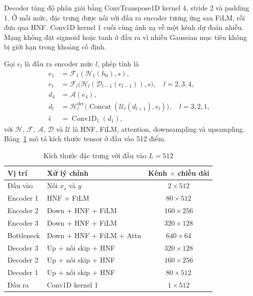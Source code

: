 \documentclass[conference]{IEEEtran}
\DeclareMathOperator{\Concat}{Concat}
\DeclareMathOperator{\Conv}{Conv1D}
\begin{document}
Decoder tăng độ phân giải bằng ConvTranspose1D kernel 4, stride 2 và padding 1. Ở mỗi mức, đặc trưng được nối với đầu ra encoder tương ứng sau FiLM, rồi đưa qua HNF. Conv1D kernel 1 cuối cùng ánh xạ về một kênh dự đoán nhiễu. Mạng không đặt sigmoid hoặc tanh ở đầu ra vì nhiễu Gaussian mục tiêu không bị giới hạn trong khoảng cố định.

Gọi $e_l$ là đầu ra encoder mức $l$, phép tính là
\begin{equation}
 \begin{aligned}
 e_1&=\mathcal{F}_1(\mathcal{H}_1(h_0),s),\\
 e_l&=\mathcal{F}_l\bigl(\mathcal{H}_l(\mathcal{D}_{l-1}(e_{l-1})),s\bigr),
       \quad l=2,3,4,\\
 d_4&=\mathcal{A}(e_4),\\
 d_l&=\mathcal{H}^{\mathrm{dec}}_l
       \bigl(\Concat(\mathcal{U}_l(d_{l+1}),e_l)\bigr),
       \quad l=3,2,1,\\
 \hat\epsilon&=\Conv_1(d_1),
 \end{aligned}
 \label{eq:unet}
\end{equation}
với $\mathcal{H}$, $\mathcal{F}$, $\mathcal{A}$, $\mathcal{D}$ và $\mathcal{U}$ là HNF, FiLM, attention, downsampling và upsampling. Bảng~\ref{tab:architecture} mô tả kích thước tensor ở đầu vào 512 điểm.

\begin{table}[t]
 \caption{Kích thước đặc trưng với đầu vào $L=512$}
 \label{tab:architecture}
 \centering\small
 \begin{tabular}{@{}llc@{}}
 \toprule
 Vị trí & Xử lý chính & Kênh $\times$ chiều dài\\
 \midrule
 Đầu vào & Nối $x_s$ và $y$ & $2\times512$\\
 Encoder 1 & HNF + FiLM & $80\times512$\\
 Encoder 2 & Down + HNF + FiLM & $160\times256$\\
 Encoder 3 & Down + HNF + FiLM & $320\times128$\\
 Bottleneck & Down + HNF + FiLM + Attn & $640\times64$\\
 Decoder 3 & Up + nối skip + HNF & $320\times128$\\
 Decoder 2 & Up + nối skip + HNF & $160\times256$\\
 Decoder 1 & Up + nối skip + HNF & $80\times512$\\
 Đầu ra & Conv1D kernel 1 & $1\times512$\\
 \bottomrule
 \end{tabular}
\end{table}
\end{document}
